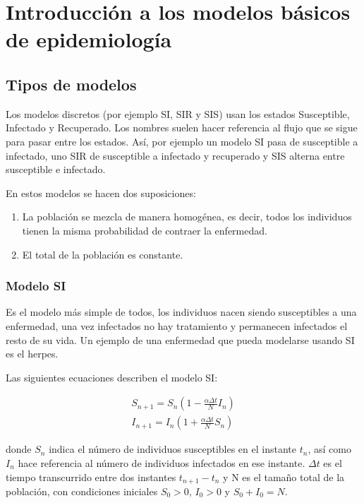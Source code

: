 \chapter{Introducción a los modelos básicos de epidemiología}

\section{Tipos de modelos}

Los modelos discretos (por ejemplo SI, SIR y SIS) usan los estados Susceptible, Infectado y Recuperado. Los nombres suelen hacer referencia al flujo que se sigue para pasar entre los estados. Así, por ejemplo un modelo SI pasa de susceptible a infectado, uno SIR de susceptible a infectado y recuperado y SIS alterna entre susceptible e infectado.

En estos modelos se hacen dos suposiciones:
\begin{enumerate}
\item La población se mezcla de manera homogénea, es decir, todos los individuos tienen la misma probabilidad de contraer la enfermedad.
\item El total de la población es constante.
\end{enumerate}

\subsection{Modelo SI}
Es el modelo más simple de todos, los individuos nacen siendo susceptibles a una enfermedad, una vez infectados no hay tratamiento y permanecen infectados el resto de su vida.
Un ejemplo de una enfermedad que pueda modelarse usando SI es el herpes.

Las siguientes ecuaciones describen el modelo SI:

\begin{equation}
\label{eqn: SI}
\begin{aligned}
S_{n+1}=S_n\left( 1-\frac{\alpha\Delta t}{N}I_n\right) \\
I_{n+1}=I_n\left( 1+\frac{\alpha\Delta t}{N}S_n\right)
\end{aligned}
\end{equation}

donde $S_n$ indica el número de individuos susceptibles en el instante $t_n$, así como $I_n$ hace referencia al número de individuos infectados en ese instante. $\Delta t$ es el tiempo transcurrido entre dos instantes $t_{n+1}-t_n$ y N es el tamaño total de la población, con condiciones iniciales $S_0>0$, $I_0>0$ y $S_0+I_0=N$.

